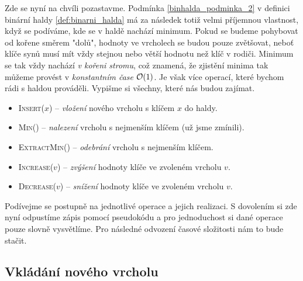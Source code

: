 Zde se nyní na chvíli pozastavme. Podmínka \ref{binhalda_podminka_2} v definici binární haldy \ref{def:binarni_halda} má za následek totiž velmi příjemnou vlastnost, když se podíváme, kde se v haldě nachází minimum. Pokud se budeme pohybovat od kořene směrem "dolů", hodnoty ve vrcholech se budou pouze zvětšovat, neboť klíče synů musí mít vždy stejnou nebo větší hodnotu než klíč v rodiči. Minimum se tak vždy nachází \emph{v kořeni stromu}, což znamená, že zjistění minima tak můžeme provést v \emph{konstantním čase} $\mathcal{O}(1)$.
Je však více operací, které bychom rádi s haldou prováděli. Vypišme si všechny, které nás budou zajímat.
\begin{itemize}
    \item \textsc{Insert}($x$) -- \emph{vložení} nového vrcholu s klíčem $x$ do haldy.
    \item \textsc{Min}() -- \emph{nalezení} vrcholu s nejmenším klíčem (už jsme zmínili).
    \item \textsc{ExtractMin}() -- \emph{odebrání} vrcholu s nejmenším klíčem.
    \item \textsc{Increase}($v$) -- \emph{zvýšení} hodnoty klíče ve zvoleném vrcholu $v$.
    \item \textsc{Decrease}($v$) -- \emph{snížení} hodnoty klíče ve zvoleném vrcholu $v$.
\end{itemize}

Podívejme se postupně na jednotlivé operace a jejich realizaci. S dovolením si zde nyní odpustíme zápis pomocí pseudokódu a pro jednoduchost si dané operace pouze slovně vysvětlíme. Pro následné odvození časové složitosti nám to bude stačit.

\subsection{Vkládání nového vrcholu}

